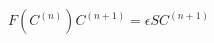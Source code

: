 \documentclass[preview]{standalone}
\begin{document}
\begin{align*}
F(C^{(n)}) C^{(n+1)} = \epsilon S C^{(n+1)}
\end{align*}
\end{document}
